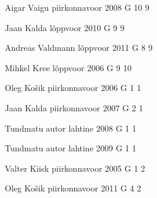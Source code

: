 \documentclass[11pt]{article}
\begin{document}
{Aigar Vaigu} %
{piirkonnavoor} %
{2008} %
{G 10} %
{9} %
{

\ifEngHint
\fi
}

{Jaan Kalda} %
{lõppvoor} %
{2010} %
{G 9} %
{9} %
{

\ifEngHint
\fi
}

{Andreas Valdmann} %
{lõppvoor} %
{2011} %
{G 8} %
{9} %
{

\ifEngHint
\fi
}

{Mihkel Kree} %
{lõppvoor} %
{2006} %
{G 9} %
{10} %
{

\ifEngHint
\fi
}

{Oleg Košik} %
{piirkonnavoor} %
{2006} %
{G 1} %
{1} %
{

\ifEngHint
\fi
}

{Jaan Kalda} %
{piirkonnavoor} %
{2007} %
{G 2} %
{1} %
{

\ifEngHint
\fi
}

{Tundmatu autor} %
{lahtine} %
{2008} %
{G 1} %
{1} %
{

\ifEngHint
\fi
}

{Tundmatu autor} %
{lahtine} %
{2009} %
{G 1} %
{1} %
{

\ifEngHint
\fi
}

{Valter Kiisk} %
{piirkonnavoor} %
{2005} %
{G 1} %
{2} %
{

\ifEngHint
\fi
}

{Oleg Košik} %
{piirkonnavoor} %
{2011} %
{G 4} %
{2} %
{

\ifEngHint
\fi
}
\end{document}
